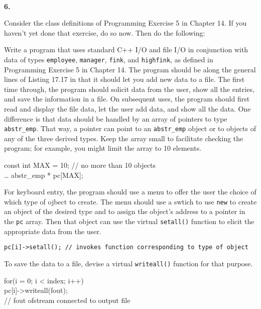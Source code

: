\documentclass[10 pt]{amsart}
\newlength{\cwidth}
\newenvironment{cpart}[2][\cwidth]
	{%
		\\ %
		\textbf{#2. }%
		\begin{minipage}[t]{#1}%
		\setlength{\parindent}{0pt}%
		\setlength{\parskip}{2ex}%
	}
	{%
		\end{minipage}%
	}
\newcommand{\ttt}[1]{\texttt{#1}}
\begin{document}
	\begin{cpart}{6}
		Consider the class definitions of Programming Exercise 5 in
		Chapter 14.
		If you haven't yet done that exercise, do so now.
		Then do the following: 

		Write a program that uses standard C++ I/O and file I/O in 
		conjunction with data of types \ttt{employee}, \ttt{manager}, 
		\ttt{fink}, and \ttt{highfink}, as defined in Programming 
		Exercise 5 in Chapter 14.
		The program should be along the general lines of Listing 17.17 
		in that it should let you add new data to a file.
		The first time through, the program should solicit
		data from the user, show all the entries, and save the 
		information in a file.
		On subsequent uses, the program should first read and display
		the file data, let the user add data, and show all the data.
		One difference is that data should be handled by an array
		of pointers to type \ttt{abstr\_emp}.
		That way, a pointer can point to an \ttt{abstr\_emp} object
		or to objects of any of the three derived types.
		Keep the array small to facilitate checking the program;
		for example, you might limit the array to 10 elements.

		{\ttfamily
			const int MAX = 10; \hspace{8 ex} // no more than 10 objects \\
			\ldots
			abstr\_emp * pc[MAX];
		}

		For keyboard entry, the program should use a menu to offer the 
		user the choice of which type of ojbect to create.
		The menu should use a swtich to use \ttt{new} to create
		an object of the desired type and to assign the object's address
		to a pointer in the \ttt{pc} array.
		Then that object can use the virtual \ttt{setall()} function to 
		elicit the appropriate data from the user.
	
		\ttt{pc[i]->setall(); \quad 
				// invokes function corresponding to type of object}

		To save the data to a file, devise a virtual \ttt{writeall()}
		function for that purpose.

		{\ttfamily
			for(i = 0; i < index; i++) \\
			\phantom{for(}pc[i]->writeall(fout); \\
			\phantom{for(}// fout ofstream connected to output file
		}
		

\end{cpart}
\end{document}
